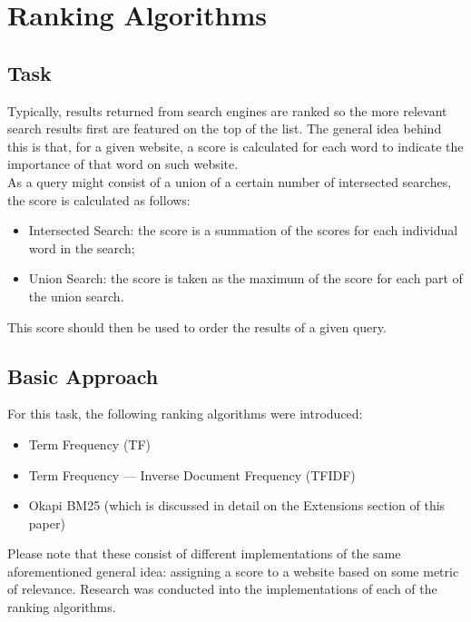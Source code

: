 \chapter{Ranking Algorithms}

\section{Task}
Typically, results returned from search engines are ranked so the more relevant search results first are featured on the top of the list. The general idea behind this is that, for a given website, a score is calculated for each word to indicate the importance of that word on such website.\\
As a query might consist of a union of a certain number of intersected searches, the score is calculated as follows:
\begin{itemize}
    \item Intersected Search: the score is a summation of the scores for each individual word in the search;
    \item Union Search: the score is taken as the maximum of the score for each part of the union search.
\end{itemize}
This score should then be used to order the results of a given query.

\section{Basic Approach}
For this task, the following ranking algorithms were introduced:
\begin{itemize}
    \item Term Frequency (TF)
    \item Term Frequency — Inverse Document Frequency (TFIDF)
    \item Okapi BM25 (which is discussed in detail on the Extensions section of this paper)
\end{itemize}
Please note that these consist of different implementations of the same aforementioned general idea: assigning a score to a website based on some metric of relevance.\newline
Research was conducted into the implementations of each of the ranking algorithms.

